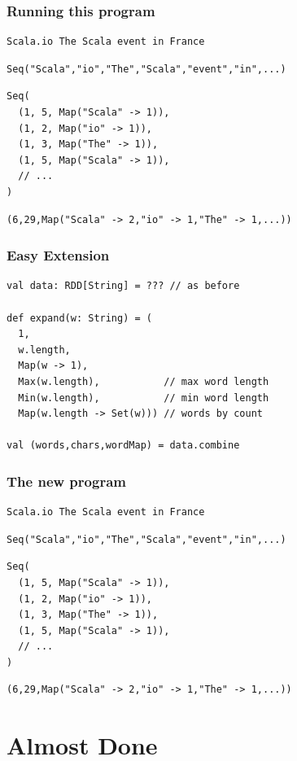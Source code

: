 \documentclass{beamer}
\begin{document}
\begin{frame}[fragile]
  \frametitle{Running this program}
\begin{verbatim}
Scala.io The Scala event in France
\end{verbatim}
\begin{verbatim}
Seq("Scala","io","The","Scala","event","in",...)
\end{verbatim}
\begin{verbatim}
Seq(
  (1, 5, Map("Scala" -> 1)),
  (1, 2, Map("io" -> 1)),
  (1, 3, Map("The" -> 1)),
  (1, 5, Map("Scala" -> 1)),
  // ...
)
\end{verbatim}
\begin{verbatim}
(6,29,Map("Scala" -> 2,"io" -> 1,"The" -> 1,...))
\end{verbatim}
\end{frame}

\begin{frame}[fragile]
  \frametitle{Easy Extension}
\begin{verbatim}
val data: RDD[String] = ??? // as before

def expand(w: String) = (
  1,
  w.length,
  Map(w -> 1),
  Max(w.length),           // max word length
  Min(w.length),           // min word length
  Map(w.length -> Set(w))) // words by count

val (words,chars,wordMap) = data.combine
\end{verbatim}
\end{frame}

\begin{frame}[fragile]
  \frametitle{The new program}
\begin{verbatim}
Scala.io The Scala event in France
\end{verbatim}
\begin{verbatim}
Seq("Scala","io","The","Scala","event","in",...)
\end{verbatim}
\begin{verbatim}
Seq(
  (1, 5, Map("Scala" -> 1)),
  (1, 2, Map("io" -> 1)),
  (1, 3, Map("The" -> 1)),
  (1, 5, Map("Scala" -> 1)),
  // ...
)
\end{verbatim}
\begin{verbatim}
(6,29,Map("Scala" -> 2,"io" -> 1,"The" -> 1,...))
\end{verbatim}
\end{frame}

\section{Almost Done}
\end{document}
